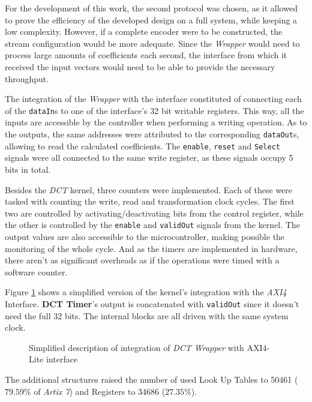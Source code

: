 For the development of this work, the second protocol was chosen, as it allowed to prove the efficiency of the developed design on a full system, while keeping a low complexity. However, if a complete encoder were to be constructed, the stream configuration would be more adequate. Since the \emph{Wrapper} would need to process large amounts of coefficients each second, the interface from which it received the input vectors would need to be able to provide the necessary throughput.

The integration of the \emph{Wrapper} with the interface constituted of connecting each of the \texttt{dataIn}s to one of the interface's 32 bit writable registers. This way, all the inputs are accessible by the controller when performing a writing operation. As to the outputs, the same addresses were attributed to the corresponding \texttt{dataOut}s, allowing to read the calculated coefficients. The \texttt{enable}, \texttt{reset} and \texttt{Select} signals were all connected to the same write register, as these signals occupy 5 bits in total.

Besides the \emph{DCT} kernel, three counters were implemented. Each of these were tasked with counting the write, read and transformation clock cycles. The first two are controlled by activating/deactivating bits from the control register, while the other is controlled by the \texttt{enable} and \texttt{validOut} signals from the kernel. The output values are also accessible to the microcontroller, making possible the monitoring of the whole cycle. And as the timers are implemented in hardware, there aren't as significant overheads as if the operations were timed with a software counter.

Figure \ref{fig:axi4int} shows a simplified version of the kernel's integration with the \emph{AXI4} Interface. \textbf{DCT Timer}'s output is concatenated with \texttt{validOut} since it doesn't need the full 32 bits. The internal blocks are all driven with the same system clock.

\begin{figure}[htb]
    \centering
    
    \caption{Simplified description of integration of \emph{DCT Wrapper} with AXI4-Lite interface}
    \label{fig:axi4int}
\end{figure}

The additional structures raised the number of used Look Up Tables to 50461 ($79.59\%$ of \emph{Artix 7}) and Registers to 34686 ($27.35\%$).

